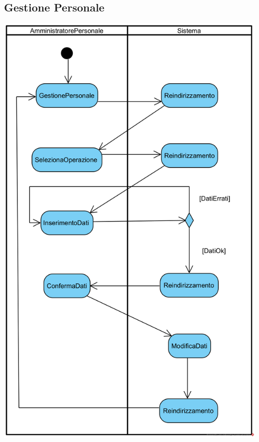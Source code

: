 \documentclass[12pt,a4paper]{article}
\begin{document}
\subsection{Gestione Personale}
\begin{center}
\includegraphics[height=0.95\textheight]{ActivityDiagram/GestionePersonale}
\end{center}
\end{document}
